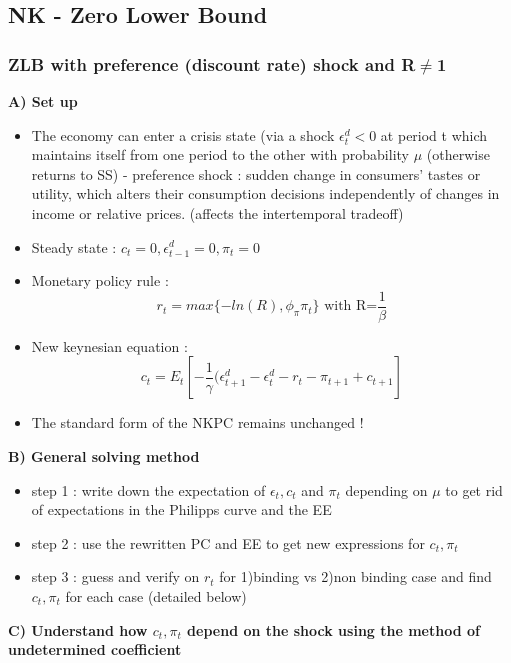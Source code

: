 \documentclass{article}
\begin{document}
\subsection{NK - Zero Lower Bound}

\subsubsection{ZLB with preference (discount rate) shock and R$\neq$1}
\textbf{A) Set up}
\begin{itemize}
    \item The economy can enter a crisis state (via a shock $\epsilon_t^d<0$ at period t which maintains itself from one period to the other with probability $\mu$ (otherwise returns to SS)
    \subitem - preference shock : sudden change in consumers' tastes or utility, which alters their consumption decisions independently of changes in income or relative prices. (affects the intertemporal tradeoff)
    \item Steady state : $c_t=0, \epsilon_{t-1}^d=0, \pi_t=0$
    \item Monetary policy rule : 
    \begin{equation}
        r_t = max\{-ln(R),\phi_\pi\pi_t\} \text{ with R=$\frac{1}{\beta}$}
    \end{equation}
    \item New keynesian equation :
    \begin{equation}
        c_t = E_t[-\frac{1}{\gamma}(\epsilon_{t+1}^d-\epsilon_t^d-r_t-\pi_{t+1}+c_{t+1}]
    \end{equation}
    \item The standard form of the NKPC remains unchanged ! 
\end{itemize}
\textbf{B) General solving method }
\begin{itemize}
    \item step 1 : write down the expectation of $\epsilon_t, c_t$ and $\pi_t$ depending on $\mu$ to get rid of expectations in the Philipps curve and the EE
    \item step 2 : use the rewritten PC and EE to get new expressions for $c_t, \pi_t$ 
    \item step 3 : guess and verify on $r_t$ for 1)binding vs 2)non binding case and find $c_t,\pi_t$ for each case (detailed below)
\end{itemize}
\textbf{C) Understand how $c_t,\pi_t$ depend on the shock using the method of undetermined coefficient}
\end{document}
